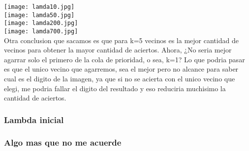 \texttt{[image: lamda10.jpg]}\\
\texttt{[image: lamda50.jpg]}\\
\texttt{[image: lamda200.jpg]}\\
\texttt{[image: lamda700.jpg]}\\


Otra conclusion que sacamos es que para k=5 vecinos es la mejor cantidad de vecinos para obtener la mayor cantidad de aciertos. 
Ahora, ¿No seria mejor agarrar solo el primero de la cola de prioridad, o sea, k=1? 
Lo que podria pasar es que el unico vecino que agarremos, sea el mejor pero no alcance para saber cual es el digito de la imagen, ya que si no se acierta con el unico vecino que elegi, me podria fallar el digito del resultado y eso reduciria muchisimo la cantidad de aciertos.

\subsubsection{Lambda inicial}

\subsubsection{Algo mas que no me acuerde}
